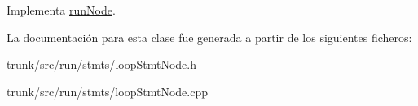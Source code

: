 Implementa \hyperlink{classrunNode_a83c10df8148829b08e04153c93d69eec}{run\-Node}.



La documentación para esta clase fue generada a partir de los siguientes ficheros\-:\begin{DoxyCompactItemize}
\item 
trunk/src/run/stmts/\hyperlink{loopStmtNode_8h}{loop\-Stmt\-Node.\-h}\item 
trunk/src/run/stmts/loop\-Stmt\-Node.\-cpp\end{DoxyCompactItemize}
